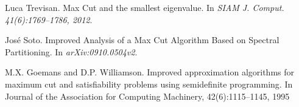   
\begin{thebibliography}{1}
Luca Trevisan.
\newblock Max Cut and the smallest eigenvalue.
\newblock In {\em SIAM J. Comput. 41(6):1769–1786, 2012}.


José Soto.
\newblock Improved Analysis of a Max Cut Algorithm Based on Spectral Partitioning.
\newblock In {\em arXiv:0910.0504v2}.

M.X. Goemans and D.P. Williamson.
\newblock Improved approximation algorithms for maximum cut and satisfiability problems using semidefinite programming.
\newblock In Journal of the Association for Computing Machinery, 42(6):1115–1145, 1995

\end{thebibliography}
